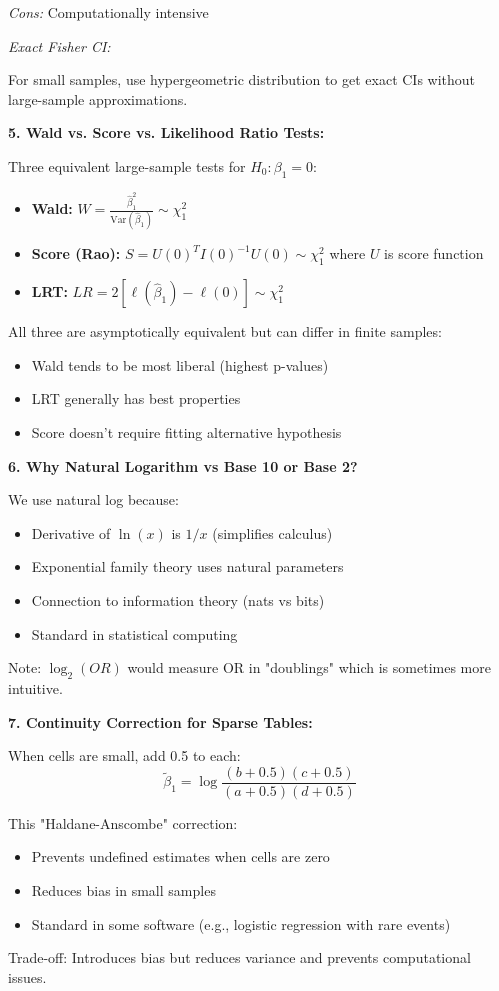 \documentclass[12pt]{article}
\begin{document}
\begin{explanation}
\textit{Cons:} Computationally intensive

\textit{Exact Fisher CI:}

For small samples, use hypergeometric distribution to get exact CIs without large-sample approximations.

\textbf{5. Wald vs. Score vs. Likelihood Ratio Tests:}

Three equivalent large-sample tests for $H_0: \beta_1 = 0$:

\begin{itemize}
\item \textbf{Wald:} $W = \frac{\hat{\beta}_1^2}{\text{Var}(\hat{\beta}_1)} \sim \chi^2_1$
\item \textbf{Score (Rao):} $S = U(0)^T I(0)^{-1} U(0) \sim \chi^2_1$ where $U$ is score function
\item \textbf{LRT:} $LR = 2[\ell(\hat{\beta}_1) - \ell(0)] \sim \chi^2_1$
\end{itemize}

All three are asymptotically equivalent but can differ in finite samples:
\begin{itemize}
\item Wald tends to be most liberal (highest p-values)
\item LRT generally has best properties
\item Score doesn't require fitting alternative hypothesis
\end{itemize}

\textbf{6. Why Natural Logarithm vs Base 10 or Base 2?}

We use natural log because:
\begin{itemize}
\item Derivative of $\ln(x)$ is $1/x$ (simplifies calculus)
\item Exponential family theory uses natural parameters
\item Connection to information theory (nats vs bits)
\item Standard in statistical computing
\end{itemize}

Note: $\log_2(OR)$ would measure OR in "doublings" which is sometimes more intuitive.

\textbf{7. Continuity Correction for Sparse Tables:}

When cells are small, add 0.5 to each:
\[
\tilde{\beta}_1 = \log\frac{(b+0.5)(c+0.5)}{(a+0.5)(d+0.5)}
\]

This "Haldane-Anscombe" correction:
\begin{itemize}
\item Prevents undefined estimates when cells are zero
\item Reduces bias in small samples
\item Standard in some software (e.g., logistic regression with rare events)
\end{itemize}

Trade-off: Introduces bias but reduces variance and prevents computational issues.
\end{explanation}
\end{document}
